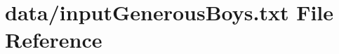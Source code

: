 \hypertarget{inputGenerousBoys_8txt}{}\section{data/input\+Generous\+Boys.txt File Reference}
\label{inputGenerousBoys_8txt}
